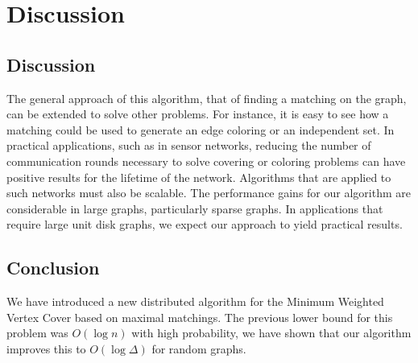 \documentclass[review ]{elsarticle}
\begin{document}


\section{Discussion}

\subsection{Discussion}
The general approach of this algorithm, that of finding a matching on the graph, can be extended to solve other problems. For instance, it is easy to see how a matching could be used to generate an edge coloring or an independent set. In practical applications, such as in sensor networks, reducing the number of communication rounds necessary to solve covering or coloring problems can have positive results for the lifetime of the network. Algorithms that are applied to such networks must also be scalable. The performance gains for our algorithm are considerable in large graphs, particularly sparse graphs. In applications that require large unit disk graphs, we expect our approach to yield practical results.

\subsection{Conclusion}

We have introduced a new distributed algorithm for the Minimum Weighted Vertex Cover based on maximal matchings. The previous lower bound for this problem was $O(\log n)$ with high probability, we have shown that our algorithm improves this to $O(\log \Delta)$ for random graphs. 


\end{document}
